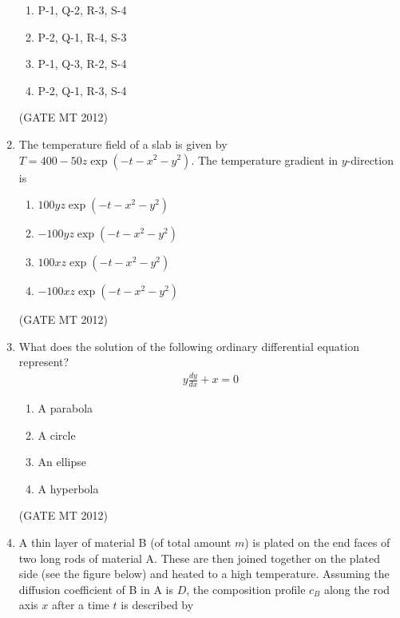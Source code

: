 \documentclass[journal, 11pt, onecolumn]{IEEEtran}
\theoremstyle{remark}
\begin{document}
\begin{enumerate}
\begin{multicols}{2}
\begin{enumerate}  
\item P-1, Q-2, R-3, S-4
\item P-2, Q-1, R-4, S-3
\item P-1, Q-3, R-2, S-4
\item P-2, Q-1, R-3, S-4
\end{enumerate}
\end{multicols}
\hfill(GATE MT 2012)

\item The temperature field of a slab is given by $T = 400 - 50z \exp(-t - x^2 - y^2)$. The temperature gradient in $y$-direction is

\begin{multicols}{2}
\begin{enumerate}  
\item $100yz \exp(-t - x^2 - y^2)$
\item $-100yz \exp(-t - x^2 - y^2)$
\item $100xz \exp(-t - x^2 - y^2)$
\item $-100xz \exp(-t - x^2 - y^2)$
\end{enumerate}
\end{multicols}
\hfill(GATE MT 2012)

\item What does the solution of the following ordinary differential equation represent? 
\begin{align}
    y \frac{dy}{dx} + x = 0
\end{align}

\begin{multicols}{2}
\begin{enumerate}  
\item A parabola
\item A circle
\item An ellipse
\item A hyperbola
\end{enumerate}
\end{multicols}
\hfill(GATE MT 2012)

\item A thin layer of material B (of total amount $m$) is plated on the end faces of two long rods of material A. These are then joined together on the plated side (see the figure below) and heated to a high temperature. Assuming the diffusion coefficient of B in A is $D$, the composition profile $c_B$ along the rod axis $x$ after a time $t$ is described by


\end{enumerate}
\end{document}

